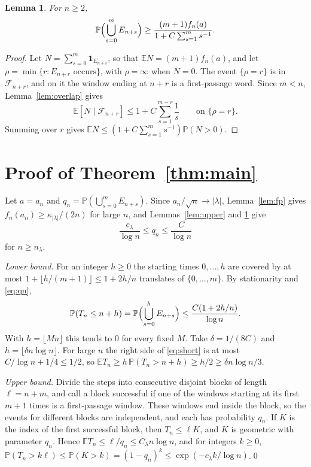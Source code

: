 \documentclass[11pt]{amsart}
\newtheorem{lemma}[theorem]{Lemma}
\theoremstyle{remark}
\numberwithin{equation}{section}
\newcommand{\PP}{\mathbb{P}}
\newcommand{\EE}{\mathbb{E}}
\begin{document}
\begin{lemma}\label{lem:lower}
For $n\ge2$,
\[
\PP\Bigl(\bigcup_{s=0}^mE_{n+s}\Bigr)\ge\frac{(m+1)f_n(a)}{1+C\sum_{s=1}^ms^{-1}}.
\]
\end{lemma}

\begin{proof}
Let $N=\sum_{s=0}^m\mathbf 1_{E_{n+s}}$, so that $\EE N=(m+1)f_n(a)$, and let $\rho=\min\{r:E_{n+r}\text{ occurs}\}$, with $\rho=\infty$ when $N=0$. The event $\{\rho=r\}$ is in $\mathcal F_{n+r}$, and on it the window ending at $n+r$ is a first-passage word. Since $m<n$, Lemma~\ref{lem:overlap} gives
\[
\EE[N\mid\mathcal F_{n+r}]\le1+C\sum_{s=1}^{m-r}\frac1s\qquad\text{on }\{\rho=r\}.
\]
Summing over $r$ gives $\EE N\le(1+C\sum_{s=1}^ms^{-1})\PP(N>0)$.
\end{proof}

\section{Proof of Theorem~\ref{thm:main}}\label{sec:proof}

Let $a=a_n$ and $q_n=\PP(\bigcup_{s=0}^mE_{n+s})$. Since $a_n/\sqrt n\to|\lambda|$, Lemma~\ref{lem:fp} gives $f_n(a_n)\ge\kappa_{|\lambda|}/(2n)$ for large $n$, and Lemmas~\ref{lem:upper} and \ref{lem:lower} give
\begin{equation}\label{eq:qn}
\frac{c_\lambda}{\log n}\le q_n\le\frac C{\log n}
\end{equation}
for $n\ge n_\lambda$.

\emph{Lower bound.} For an integer $h\ge0$ the starting times $0,\dots,h$ are covered by at most $1+\lfloor h/(m+1)\rfloor\le1+2h/n$ translates of $\{0,\dots,m\}$. By stationarity and \eqref{eq:qn},
\begin{equation}\label{eq:short}
\PP(T_n\le n+h)=\PP\Bigl(\bigcup_{s=0}^hE_{n+s}\Bigr)\le\frac{C(1+2h/n)}{\log n}.
\end{equation}
With $h=\lfloor Mn\rfloor$ this tends to $0$ for every fixed $M$. Take $\delta=1/(8C)$ and $h=\lfloor\delta n\log n\rfloor$. For large $n$ the right side of \eqref{eq:short} is at most $C/\log n+1/4\le1/2$, so $\EE T_n\ge h\,\PP(T_n>n+h)\ge h/2\ge\delta n\log n/3$.

\emph{Upper bound.} Divide the steps into consecutive disjoint blocks of length $\ell=n+m$, and call a block successful if one of the windows starting at its first $m+1$ times is a first-passage window. These windows end inside the block, so the events for different blocks are independent, and each has probability $q_n$. If $K$ is the index of the first successful block, then $T_n\le\ell K$, and $K$ is geometric with parameter $q_n$. Hence $\EE T_n\le\ell/q_n\le C_\lambda n\log n$, and for integers $k\ge0$, $\PP(T_n>k\ell)\le\PP(K>k)=(1-q_n)^k\le\exp(-c_\lambda k/\log n)$.\qed
\end{document}
